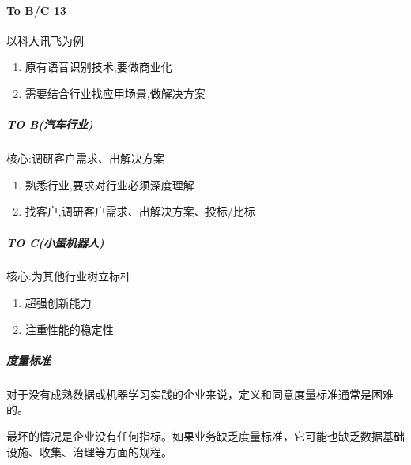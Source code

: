 \documentclass[letterpaper,11pt,english]{sphinxmanual}
\begin{document}
\paragraph{To B/C 13\sphinxfootnotemark[259]}
\label{\detokenize{chapter_introduction/AI_PM:to-b-c-13}}%
\begin{footnotetext}[259]\sphinxAtStartFootnote
{}
%
\end{footnotetext}\ignorespaces 
以科大讯飞为例
\begin{enumerate}
%
\item {} 
原有语音识别技术,要做商业化

\item {} 
需要结合行业找应用场景,做解决方案

\end{enumerate}


\subparagraph{TO B(汽车行业)}
\label{\detokenize{chapter_introduction/AI_PM:to-b}}
核心:调硏客户需求、出解决方案
\begin{enumerate}
%
\item {} 
熟悉行业,要求对行业必须深度理解

\item {} 
找客户,调研客户需求、出解决方案、投标/比标

\end{enumerate}


\subparagraph{TO C(小蛋机器人)}
\label{\detokenize{chapter_introduction/AI_PM:to-c}}
核心:为其他行业树立标杆
\begin{enumerate}
%
\item {} 
超强创新能力

\item {} 
注重性能的稳定性

\end{enumerate}


\subparagraph{度量标准}
\label{\detokenize{chapter_introduction/AI_PM:id35}}
对于没有成熟数据或机器学习实践的企业来说，定义和同意度量标准通常是困难的。

最坏的情况是企业没有任何指标。如果业务缺乏度量标准，它可能也缺乏数据基础设施、收集、治理等方面的规程。
\end{document}
